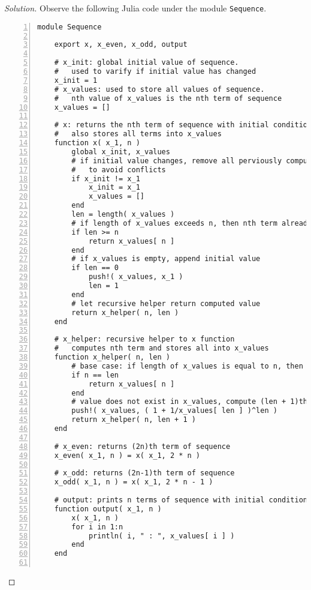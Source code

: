 \documentclass[ 12pt ]{article}
\begin{document}
\begin{enumerate}
		\begin{proof}[Solution]\renewcommand{\qedsymbol}{}
			Observe the following Julia code under the module \verb|Sequence|.
			\begin{lstlisting}[basicstyle=\ttfamily\footnotesize, numbers=left, tabsize=4, frame=single]
module Sequence

	export x, x_even, x_odd, output

	# x_init: global initial value of sequence.
	# 	used to varify if initial value has changed
	x_init = 1
	# x_values: used to store all values of sequence.
	# 	nth value of x_values is the nth term of sequence
	x_values = []

	# x: returns the nth term of sequence with initial condition x_1
	#	also stores all terms into x_values
	function x( x_1, n )
		global x_init, x_values
		# if initial value changes, remove all perviously computed values
		# 	to avoid conflicts
		if x_init != x_1
			x_init = x_1
			x_values = []
		end
		len = length( x_values )
		# if length of x_values exceeds n, then nth term already lies in x_values
		if len >= n
			return x_values[ n ]
		end
		# if x_values is empty, append initial value
		if len == 0
			push!( x_values, x_1 )
			len = 1
		end
		# let recursive helper return computed value
		return x_helper( n, len )
	end

	# x_helper: recursive helper to x function
	# 	computes nth term and stores all into x_values
	function x_helper( n, len )
		# base case: if length of x_values is equal to n, then return the value
		if n == len
			return x_values[ n ]
		end
		# value does not exist in x_values, compute (len + 1)th term and repeat
		push!( x_values, ( 1 + 1/x_values[ len ] )^len )
		return x_helper( n, len + 1 )
	end

	# x_even: returns (2n)th term of sequence
	x_even( x_1, n ) = x( x_1, 2 * n )

	# x_odd: returns (2n-1)th term of sequence
	x_odd( x_1, n ) = x( x_1, 2 * n - 1 )

	# output: prints n terms of sequence with initial condition x_1
	function output( x_1, n )
		x( x_1, n )
		for i in 1:n
			println( i, " : ", x_values[ i ] )
		end
	end


\end{lstlisting}
\end{proof}
\end{enumerate}
\end{document}
